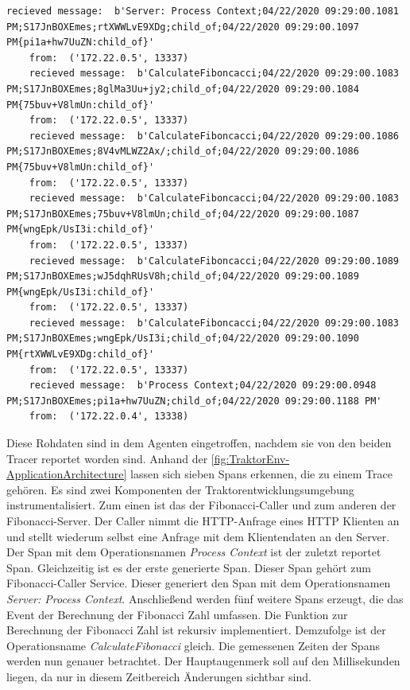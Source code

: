 \begin{minipage}[]{\textwidth}
	\begin{lstlisting}[frame=trBL]
	recieved message:  b'Server: Process Context;04/22/2020 09:29:00.1081 PM;S17JnBOXEmes;rtXWWLvE9XDg;child_of;04/22/2020 09:29:00.1097 PM{pi1a+hw7UuZN:child_of}'
	from:  ('172.22.0.5', 13337)
	recieved message:  b'CalculateFiboncacci;04/22/2020 09:29:00.1083 PM;S17JnBOXEmes;8glMa3Uu+jy2;child_of;04/22/2020 09:29:00.1084 PM{75buv+V8lmUn:child_of}'
	from:  ('172.22.0.5', 13337)
	recieved message:  b'CalculateFiboncacci;04/22/2020 09:29:00.1086 PM;S17JnBOXEmes;8V4vMLWZ2Ax/;child_of;04/22/2020 09:29:00.1086 PM{75buv+V8lmUn:child_of}'
	from:  ('172.22.0.5', 13337)
	recieved message:  b'CalculateFiboncacci;04/22/2020 09:29:00.1083 PM;S17JnBOXEmes;75buv+V8lmUn;child_of;04/22/2020 09:29:00.1087 PM{wngEpk/UsI3i:child_of}'
	from:  ('172.22.0.5', 13337)
	recieved message:  b'CalculateFiboncacci;04/22/2020 09:29:00.1089 PM;S17JnBOXEmes;wJ5dqhRUsV8h;child_of;04/22/2020 09:29:00.1089 PM{wngEpk/UsI3i:child_of}'
	from:  ('172.22.0.5', 13337)
	recieved message:  b'CalculateFiboncacci;04/22/2020 09:29:00.1083 PM;S17JnBOXEmes;wngEpk/UsI3i;child_of;04/22/2020 09:29:00.1090 PM{rtXWWLvE9XDg:child_of}'
	from:  ('172.22.0.5', 13337)
	recieved message:  b'Process Context;04/22/2020 09:29:00.0948 PM;S17JnBOXEmes;pi1a+hw7UuZN;child_of;04/22/2020 09:29:00.1188 PM'
	from:  ('172.22.0.4', 13338)
	\end{lstlisting}
	\label{listing:Tracerrohdaten aus der Traktorentwicklungsumgebung}
\end{minipage}

Diese Rohdaten sind in dem Agenten eingetroffen, nachdem sie von den beiden Tracer reportet worden sind. Anhand der \cref{fig:TraktorEnv-ApplicationArchitecture} lassen sich sieben Spans erkennen, die zu einem Trace gehören. Es sind zwei Komponenten der Traktorentwicklungsumgebung instrumentalisiert. Zum einen ist das der Fibonacci-Caller und zum anderen der Fibonacci-Server. Der Caller nimmt die HTTP-Anfrage eines HTTP Klienten an und stellt wiederum selbst eine Anfrage mit dem Klientendaten an den Server. Der Span mit dem Operationsnamen \emph{Process Context} ist der zuletzt reportet Span. Gleichzeitig ist es der erste generierte Span. Dieser Span gehört zum Fibonacci-Caller Service. Dieser generiert den Span mit dem Operationsnamen \emph{Server: Process Context}. Anschließend werden fünf weitere Spans erzeugt, die das Event der Berechnung der Fibonacci Zahl umfassen. Die Funktion zur Berechnung der Fibonacci Zahl ist rekursiv implementiert. Demzufolge ist der Operationsname \emph{CalculateFibonacci} gleich. Die gemessenen Zeiten der Spans werden nun genauer betrachtet. Der Hauptaugenmerk soll auf den Millisekunden liegen, da nur in diesem Zeitbereich Änderungen sichtbar sind.


